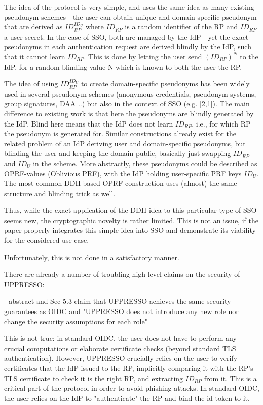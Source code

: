 \documentclass[letterpaper,onecolumn,10pt]{article}
\begin{document}
The idea of the protocol is very simple, and uses the same idea as many existing pseudonym schemes - the user can obtain unique and domain-specific pseudonym that are derived as $ID_{RP} ^ {ID_U}$ where $ID_{RP}$ is a random identifier of the RP and $ID_{RP}$ a user secret. In the case of SSO, both are managed by the IdP - yet the exact pseudonyms in each authentication request are derived blindly by the IdP, such that it cannot learn $ID_{RP}$. This is done by letting the user send $(ID_{RP})^N$ to the IdP, for a random blinding value N which is known to both the user the RP.

The idea of using $ID_{RP}^{ID_U}$ to create domain-specific pseudonyms has been widely used in several pseudonym schemes (anonymous credentials, pseudonym systems, group signatures, DAA ..) but also in the context of SSO (e.g. [2,1]). The main difference to existing work is that here the pseudonyms are blindly generated by the IdP. Blind here means that the IdP does not learn $ID_{RP}$, i.e., for which RP the pseudonym is generated for. Similar constructions already exist for the related problem of an IdP deriving user and domain-specific pseudonyms, but blinding the user and keeping the domain public, basically just swapping $ID_{RP}$ and $ID_U$ in the scheme. More abstractly, these pseudonyms could be described as OPRF-values (Oblivious PRF), with the IdP holding user-specific PRF keys $ID_U$. The most common DDH-based OPRF construction uses (almost) the same structure and blinding trick as well.

Thus, while the exact application of the DDH idea to this particular type of SSO seems new, the cryptographic novelty is rather limited. This is not an issue, if the paper properly integrates this simple idea into SSO and demonstrate its viability for the considered use case.

Unfortunately, this is not done in a satisfactory manner.

There are already a number of troubling high-level claims on the security of UPPRESSO:

- abstract and Sec 5.3 claim that UPPRESSO achieves the same security guarantees as OIDC and "UPPRESSO does not introduce any new role nor change the security assumptions for each role"

This is not true: in standard OIDC, the user does not have to perform any crucial computations or elaborate certificate checks (beyond standard TLS authentication). However, UPPRESSO crucially relies on the user to verify certificates that the IdP issued to the RP, implicitly comparing it with the RP's TLS certificate to check it is the right RP, and extracting $ID_{RP}$ from it. This is a critical part of the protocol in order to avoid phishing attacks. In standard OIDC, the user relies on the IdP to "authenticate" the RP and bind the id token to it.
\end{document}
